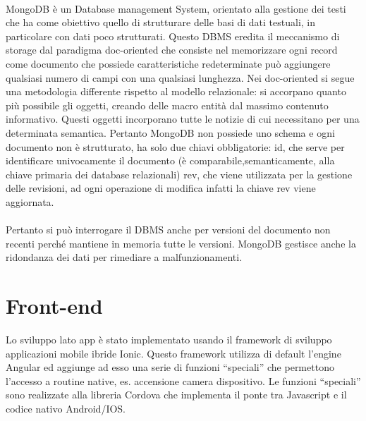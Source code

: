 \paragraph{}


MongoDB è un Database management System, orientato alla gestione dei testi che ha come obiettivo quello di strutturare delle basi di dati testuali, in particolare con dati poco strutturati.
Questo DBMS eredita il meccanismo di storage dal paradigma doc-oriented che consiste nel memorizzare ogni record come documento che possiede caratteristiche redeterminate può aggiungere qualsiasi numero di campi con una qualsiasi lunghezza.
Nei doc-oriented si segue una metodologia differente rispetto al modello relazionale: si accorpano quanto più possibile gli oggetti, creando delle macro entità dal massimo contenuto informativo. Questi oggetti incorporano tutte le notizie di cui necessitano per una determinata semantica.
Pertanto MongoDB non possiede uno schema e ogni documento non è strutturato, ha solo due chiavi obbligatorie:
id, che serve per identificare univocamente il documento (è comparabile,semanticamente, alla chiave primaria dei database relazionali)
rev, che viene utilizzata per la gestione delle revisioni, ad ogni operazione di modifica infatti la chiave rev viene aggiornata.
\paragraph{}

Pertanto si può interrogare il DBMS anche per versioni del documento non recenti perché mantiene in memoria tutte le versioni.
MongoDB gestisce anche la ridondanza dei dati per rimediare a malfunzionamenti.
\paragraph{}




\section{Front-end}


Lo sviluppo lato app è stato implementato usando il framework di sviluppo applicazioni mobile ibride Ionic.
Questo framework utilizza di default l’engine Angular ed aggiunge ad esso una serie di funzioni “speciali” che permettono l’accesso a routine native, es. accensione camera dispositivo. Le funzioni “speciali” sono realizzate alla libreria Cordova che implementa il ponte tra Javascript e il codice nativo Android/IOS.
